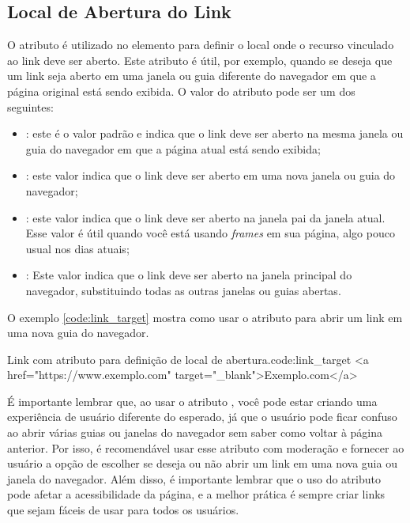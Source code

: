 \subsection{Local de Abertura do Link}

O atributo  é utilizado no elemento  para definir o local onde o recurso vinculado ao link deve ser aberto. Este atributo é útil, por exemplo, quando se deseja que um link seja aberto em uma janela ou guia diferente do navegador em que a página original está sendo exibida. O valor do atributo  pode ser um dos seguintes:

\begin{itemize}
    \item {}: este é o valor padrão e indica que o link deve ser aberto na mesma janela ou guia do navegador em que a página atual está sendo exibida;
    \item {}: este valor indica que o link deve ser aberto em uma nova janela ou guia do navegador;
    \item {}: este valor indica que o link deve ser aberto na janela pai da janela atual. Esse valor é útil quando você está usando \textit{frames} em sua página, algo pouco usual nos dias atuais;
    \item {}: Este valor indica que o link deve ser aberto na janela principal do navegador, substituindo todas as outras janelas ou guias abertas.
\end{itemize}

O exemplo \ref{code:link_target} mostra como usar o atributo  para abrir um link em uma nova guia do navegador.

\begin{htmlcode}{Link com atributo  para definição de local de abertura.}{code:link_target}
<a href="https://www.exemplo.com" target="_blank">Exemplo.com</a>
\end{htmlcode}

É importante lembrar que, ao usar o atributo , você pode estar criando uma experiência de usuário diferente do esperado, já que o usuário pode ficar confuso ao abrir várias guias ou janelas do navegador sem saber como voltar à página anterior. Por isso, é recomendável usar esse atributo com moderação e fornecer ao usuário a opção de escolher se deseja ou não abrir um link em uma nova guia ou janela do navegador. Além disso, é importante lembrar que o uso do atributo  pode afetar a acessibilidade da página, e a melhor prática é sempre criar links que sejam fáceis de usar para todos os usuários.

